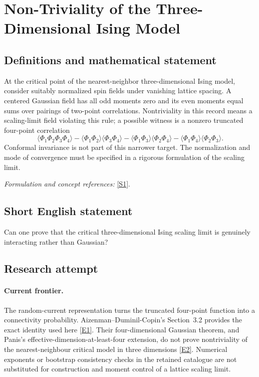 \documentclass[11pt,a4paper]{article}
\numberwithin{equation}{section}
\newcommand{\sref}[2]{\hyperlink{source:#1:#2}{[S#2]}}
\newcommand{\eref}[2]{\hyperlink{extra:#1:#2}{[E#2]}}
\newif\ifshowcatalogue
\newcommand{\cataloguescope}[1]{\ifshowcatalogue
 \paragraph{Exact scope in the supplied catalogue.}
 \begin{quote}\small #1\end{quote}\fi}
\begin{document}
\setcounter{section}{0}
\section*{\texorpdfstring{Non-Triviality of the Three-Dimensional Ising Model}{Non-Triviality of the Three-Dimensional Ising Model}}\label{30006710}
\subsection{Definitions and mathematical statement}
At the critical point of the nearest-neighbor three-dimensional Ising model, consider suitably normalized spin fields under vanishing lattice spacing. A centered Gaussian field has all odd moments zero and its even moments equal sums over pairings of two-point correlations. Nontriviality in this record means a scaling-limit field violating this rule; a possible witness is a nonzero truncated four-point correlation
\[
 \langle\Phi_1\Phi_2\Phi_3\Phi_4\rangle
 -\langle\Phi_1\Phi_2\rangle\langle\Phi_3\Phi_4\rangle
 -\langle\Phi_1\Phi_3\rangle\langle\Phi_2\Phi_4\rangle
 -\langle\Phi_1\Phi_4\rangle\langle\Phi_2\Phi_3\rangle.
\]
Conformal invariance is not part of this narrower target. The normalization and mode of convergence must be specified in a rigorous formulation of the scaling limit.
\par\smallskip\textit{Formulation and concept references:} \sref{30006710}{1}.
\cataloguescope{Prove that the critical three-dimensional Ising model is non-trivial, that is, that its scaling limit is not Gaussian and its critical spin correlations do not factorize according to Wick's rule.}
\subsection{Short English statement}
Can one prove that the critical three-dimensional Ising scaling limit is genuinely interacting rather than Gaussian?
\subsection{Research attempt}

\paragraph{Current frontier.}
The random-current representation turns the truncated four-point function
into a connectivity probability. Aizenman--Duminil-Copin's Section~3.2
provides the exact identity used here \eref{30006710}{1}. Their four-dimensional
Gaussian theorem, and Panis's effective-dimension-at-least-four extension,
do not prove nontriviality of the nearest-neighbour critical model in
three dimensions \eref{30006710}{2}. Numerical exponents or bootstrap consistency
checks in the retained catalogue are not substituted for construction and
moment control of a lattice scaling limit.
\end{document}
